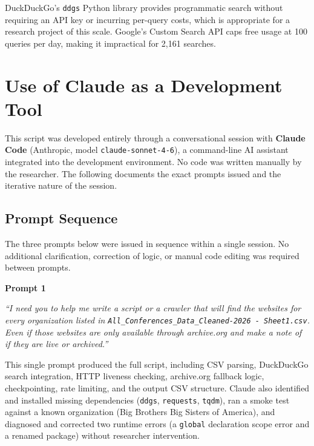 \documentclass[12pt]{article}
\begin{document}
DuckDuckGo's \texttt{ddgs} Python library provides programmatic search
without requiring an API key or incurring per-query costs, which is appropriate
for a research project of this scale. Google's Custom Search API caps free
usage at 100 queries per day, making it impractical for 2,161 searches.

\section{Use of Claude as a Development Tool}

This script was developed entirely through a conversational session with
\textbf{Claude Code} (Anthropic, model \texttt{claude-sonnet-4-6}), a
command-line AI assistant integrated into the development environment.
No code was written manually by the researcher. The following documents
the exact prompts issued and the iterative nature of the session.

\subsection{Prompt Sequence}

The three prompts below were issued in sequence within a single session.
No additional clarification, correction of logic, or manual code editing
was required between prompts.

\begin{mdframed}[backgroundcolor=gray!8, linecolor=gray!40]
\textbf{Prompt 1}

\textit{``I need you to help me write a script or a crawler that will find
the websites for every organization listed in
\texttt{All\_Conferences\_Data\_Cleaned-2026 - Sheet1.csv}.
Even if those websites are only available through archive.org and make a
note of if they are live or archived.''}
\end{mdframed}

\vspace{0.5em}

This single prompt produced the full script, including CSV parsing,
DuckDuckGo search integration, HTTP liveness checking, archive.org fallback
logic, checkpointing, rate limiting, and the output CSV structure.
Claude also identified and installed missing dependencies (\texttt{ddgs},
\texttt{requests}, \texttt{tqdm}), ran a smoke test against a known
organization (Big Brothers Big Sisters of America), and diagnosed and
corrected two runtime errors (a \texttt{global} declaration scope error
and a renamed package) without researcher intervention.
\end{document}
